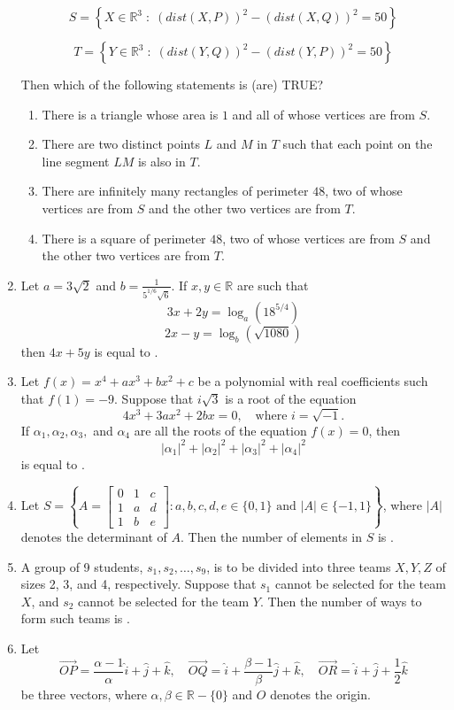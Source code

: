 \documentclass[12pt,a4paper]{article}
\begin{document}
\begin{enumerate}
\[
S = \left\{ X \in \mathbb{R}^3 \; : \; (dist(X,P))^2 - (dist(X,Q))^2 = 50 \right\}
\]

\[
T = \left\{ Y \in \mathbb{R}^3 \; : \; (dist(Y,Q))^2 - (dist(Y,P))^2 = 50 \right\}
\]

Then which of the following statements is (are) TRUE?

\begin{enumerate}
    \item There is a triangle whose area is $1$ and all of whose vertices are from $S$.
    \item There are two distinct points $L$ and $M$ in $T$ such that each point on the line segment $LM$ is also in $T$.
    \item There are infinitely many rectangles of perimeter $48$, two of whose vertices are from $S$ and the other two vertices are from $T$.
    \item There is a square of perimeter $48$, two of whose vertices are from $S$ and the other two vertices are from $T$.
\end{enumerate}
\item Let $a = 3\sqrt{2}$ and $b = \frac{1}{5^{1/6} \sqrt{6}}$. If $x, y \in \mathbb{R}$ are such that  
\[
    3x + 2y = \log_a \left( 18^{5/4} \right)
\]
\[
    2x - y = \log_b \left( \sqrt{1080} \right)
\]
    then $4x + 5y$ is equal to \underline{\quad \quad}.
\item Let $f(x) = x^4 + ax^3 + bx^2 + c$ be a polynomial with real coefficients such that $f(1) = -9$. Suppose that $i\sqrt{3}$ is a root of the equation  
\[
    4x^3 + 3ax^2 + 2bx = 0, \quad \text{where } i = \sqrt{-1}.
\]
    If $\alpha_1, \alpha_2, \alpha_3,$ and $\alpha_4$ are all the roots of the equation $f(x) = 0$, then  
\[
    |\alpha_1|^2 + |\alpha_2|^2 + |\alpha_3|^2 + |\alpha_4|^2
\]
    is equal to \underline{\quad \quad}.
\item Let $S = \left\{ A =  
    \begin{bmatrix}  
    0 & 1 & c \\  
    1 & a & d \\  
    1 & b & e  
    \end{bmatrix}  
    : a, b, c, d, e \in \{0,1\} \text{ and } |A| \in \{-1,1\}  
    \right\}$,  
    where $|A|$ denotes the determinant of $A$.  
    Then the number of elements in $S$ is \underline{\quad \quad}.
\item A group of 9 students, $s_1, s_2, \dots, s_9$, is to be divided into three teams $X, Y, Z$ of sizes 2, 3, and 4, respectively. Suppose that $s_1$ cannot be selected for the team $X$, and $s_2$ cannot be selected for the team $Y$.  
    Then the number of ways to form such teams is \underline{\quad \quad}.
\item Let  
\[\overrightarrow{OP} = \frac{\alpha -1}{\alpha} \hat{i} + \hat{j} + \hat{k}, \quad
    \overrightarrow{OQ} = \hat{i} + \frac{\beta -1}{\beta} \hat{j} + \hat{k}, \quad
    \overrightarrow{OR} = \hat{i} + \hat{j} + \frac{1}{2} \hat{k}
\]
    be three vectors, where $\alpha, \beta \in \mathbb{R} - \{0\}$ and $O$ denotes the origin.  


\end{enumerate}
\end{document}

